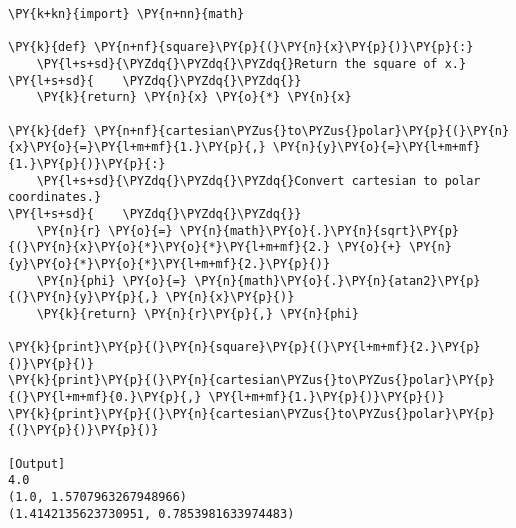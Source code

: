 \begin{Verbatim}[label=\makebox{\url{https://bitbucket.org/lbaldini/programming/src/tip/snippets/func1.py}},commandchars=\\\{\}]
\PY{k+kn}{import} \PY{n+nn}{math}

\PY{k}{def} \PY{n+nf}{square}\PY{p}{(}\PY{n}{x}\PY{p}{)}\PY{p}{:}
    \PY{l+s+sd}{\PYZdq{}\PYZdq{}\PYZdq{}Return the square of x.}
\PY{l+s+sd}{    \PYZdq{}\PYZdq{}\PYZdq{}}
    \PY{k}{return} \PY{n}{x} \PY{o}{*} \PY{n}{x}

\PY{k}{def} \PY{n+nf}{cartesian\PYZus{}to\PYZus{}polar}\PY{p}{(}\PY{n}{x}\PY{o}{=}\PY{l+m+mf}{1.}\PY{p}{,} \PY{n}{y}\PY{o}{=}\PY{l+m+mf}{1.}\PY{p}{)}\PY{p}{:}
    \PY{l+s+sd}{\PYZdq{}\PYZdq{}\PYZdq{}Convert cartesian to polar coordinates.}
\PY{l+s+sd}{    \PYZdq{}\PYZdq{}\PYZdq{}}
    \PY{n}{r} \PY{o}{=} \PY{n}{math}\PY{o}{.}\PY{n}{sqrt}\PY{p}{(}\PY{n}{x}\PY{o}{*}\PY{o}{*}\PY{l+m+mf}{2.} \PY{o}{+} \PY{n}{y}\PY{o}{*}\PY{o}{*}\PY{l+m+mf}{2.}\PY{p}{)}
    \PY{n}{phi} \PY{o}{=} \PY{n}{math}\PY{o}{.}\PY{n}{atan2}\PY{p}{(}\PY{n}{y}\PY{p}{,} \PY{n}{x}\PY{p}{)}
    \PY{k}{return} \PY{n}{r}\PY{p}{,} \PY{n}{phi}

\PY{k}{print}\PY{p}{(}\PY{n}{square}\PY{p}{(}\PY{l+m+mf}{2.}\PY{p}{)}\PY{p}{)}
\PY{k}{print}\PY{p}{(}\PY{n}{cartesian\PYZus{}to\PYZus{}polar}\PY{p}{(}\PY{l+m+mf}{0.}\PY{p}{,} \PY{l+m+mf}{1.}\PY{p}{)}\PY{p}{)}
\PY{k}{print}\PY{p}{(}\PY{n}{cartesian\PYZus{}to\PYZus{}polar}\PY{p}{(}\PY{p}{)}\PY{p}{)}

[Output]
4.0
(1.0, 1.5707963267948966)
(1.4142135623730951, 0.7853981633974483)
\end{Verbatim}